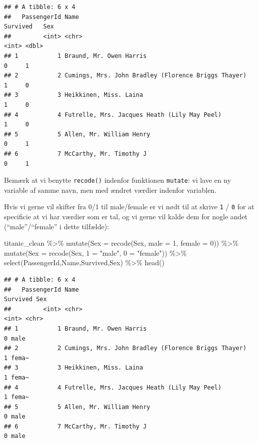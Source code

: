 \documentclass[
]{book}
\newenvironment{Shaded}{\begin{snugshade}}{\end{snugshade}}
\newcommand{\AttributeTok}[1]{\textcolor[rgb]{0.77,0.63,0.00}{#1}}
\newcommand{\DecValTok}[1]{\textcolor[rgb]{0.00,0.00,0.81}{#1}}
\newcommand{\FunctionTok}[1]{\textcolor[rgb]{0.00,0.00,0.00}{#1}}
\newcommand{\NormalTok}[1]{#1}
\newcommand{\OtherTok}[1]{\textcolor[rgb]{0.56,0.35,0.01}{#1}}
\newcommand{\SpecialCharTok}[1]{\textcolor[rgb]{0.00,0.00,0.00}{#1}}
\newcommand{\StringTok}[1]{\textcolor[rgb]{0.31,0.60,0.02}{#1}}
\begin{document}
\begin{verbatim}
## # A tibble: 6 x 4
##   PassengerId Name                                                Survived   Sex
##         <int> <chr>                                                  <int> <dbl>
## 1           1 Braund, Mr. Owen Harris                                    0     1
## 2           2 Cumings, Mrs. John Bradley (Florence Briggs Thayer)        1     0
## 3           3 Heikkinen, Miss. Laina                                     1     0
## 4           4 Futrelle, Mrs. Jacques Heath (Lily May Peel)               1     0
## 5           5 Allen, Mr. William Henry                                   0     1
## 6           7 McCarthy, Mr. Timothy J                                    0     1
\end{verbatim}

Bemærk at vi benytte \texttt{recode()} indenfor funktionen \texttt{mutate}: vi lave en ny variable af samme navn, men med ændret værdier indenfor variablen.

Hvis vi gerne vil skifter fra 0/1 til male/female er vi nødt til at skrive \texttt{1} / \texttt{0} for at specificie at vi har værdier som er tal, og vi gerne vil kalde dem for nogle andet (``male''/``female'' i dette tilfælde):

\begin{Shaded}
\begin{Highlighting}[]
\NormalTok{ titanic\_clean }\SpecialCharTok{\%\textgreater{}\%}
   \FunctionTok{mutate}\NormalTok{(}\AttributeTok{Sex =} \FunctionTok{recode}\NormalTok{(Sex,  }\AttributeTok{male =} \DecValTok{1}\NormalTok{, }\AttributeTok{female =} \DecValTok{0}\NormalTok{)) }\SpecialCharTok{\%\textgreater{}\%}
   \FunctionTok{mutate}\NormalTok{(}\AttributeTok{Sex =} \FunctionTok{recode}\NormalTok{(Sex,  }\StringTok{\textasciigrave{}}\AttributeTok{1}\StringTok{\textasciigrave{}} \OtherTok{=} \StringTok{"male"}\NormalTok{, }\StringTok{\textasciigrave{}}\AttributeTok{0}\StringTok{\textasciigrave{}} \OtherTok{=} \StringTok{"female"}\NormalTok{)) }\SpecialCharTok{\%\textgreater{}\%}
   \FunctionTok{select}\NormalTok{(PassengerId,Name,Survived,Sex) }\SpecialCharTok{\%\textgreater{}\%} \FunctionTok{head}\NormalTok{()}
\end{Highlighting}
\end{Shaded}

\begin{verbatim}
## # A tibble: 6 x 4
##   PassengerId Name                                                Survived Sex  
##         <int> <chr>                                                  <int> <chr>
## 1           1 Braund, Mr. Owen Harris                                    0 male 
## 2           2 Cumings, Mrs. John Bradley (Florence Briggs Thayer)        1 fema~
## 3           3 Heikkinen, Miss. Laina                                     1 fema~
## 4           4 Futrelle, Mrs. Jacques Heath (Lily May Peel)               1 fema~
## 5           5 Allen, Mr. William Henry                                   0 male 
## 6           7 McCarthy, Mr. Timothy J                                    0 male
\end{verbatim}
\end{document}
